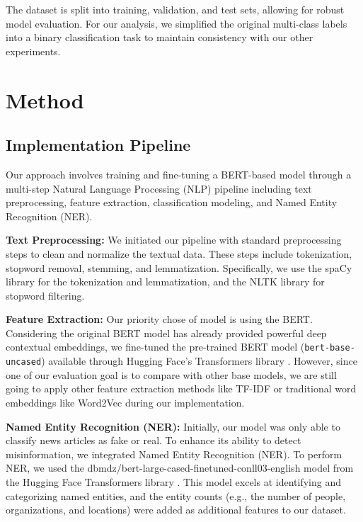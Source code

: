 \documentclass[11pt,a4paper]{article}
\begin{document}
The dataset is split into training, validation, and test sets, allowing for robust model evaluation. For our analysis, we simplified the original multi-class labels into a binary classification task to maintain consistency with our other experiments.

\section{Method}

\subsection{Implementation Pipeline}

Our approach involves training and fine-tuning a BERT-based model through a multi-step Natural Language Processing (NLP) pipeline including text preprocessing, feature extraction, classification modeling, and Named Entity Recognition (NER).

\textbf{Text Preprocessing:} We initiated our pipeline with standard preprocessing steps to clean and normalize the textual data. 
These steps include tokenization, stopword removal, stemming, and lemmatization. Specifically, we use the spaCy library for the tokenization and lemmatization, 
and the NLTK library for stopword filtering.

\textbf{Feature Extraction:} Our priority chose of model is using the BERT. Considering the original BERT model has already provided powerful deep contextual embeddings, 
we fine-tuned the pre-trained BERT model (\texttt{bert-base-uncased}) available through Hugging Face's Transformers library \cite{DBLP:journals/corr/abs-1810-04805}. 
However, since one of our evaluation goal is to compare with other base models, we are still going to apply other feature extraction methods like TF-IDF or traditional word embeddings like Word2Vec during our implementation. 

\textbf{Named Entity Recognition (NER):} Initially, our model was only able to classify news articles as fake or real. To enhance its ability to detect misinformation, we integrated Named Entity Recognition (NER). 
To perform NER, we used the dbmdz/bert-large-cased-finetuned-conll03-english model from the Hugging Face Transformers library \cite{dbmdz_bert_large_cased_conll03}. This model excels at identifying and categorizing named entities, and the entity counts (e.g., the number of people, organizations, and locations) were added as additional features to our dataset.
\end{document}
